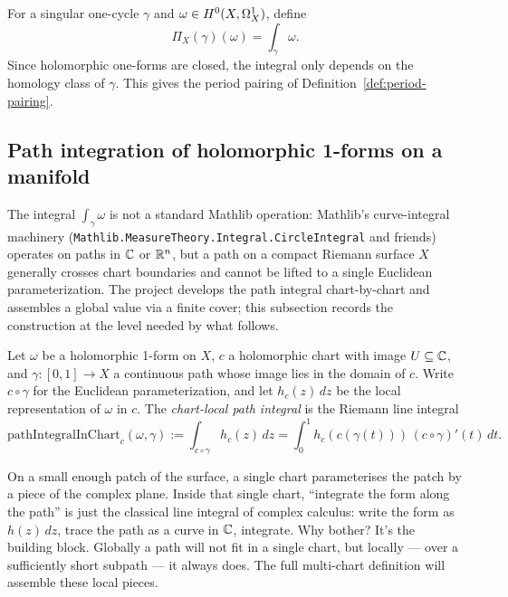 For a singular one-cycle \(\gamma\) and \(\omega\in H^{0}(X,\Omega^{1}_{X})\), define
\[
  \Pi_X(\gamma)(\omega)=\int_{\gamma}\omega.
\]
Since holomorphic one-forms are closed, the integral only depends on the
homology class of \(\gamma\). This gives the period pairing of
Definition~\ref{def:period-pairing}.

\subsection{Path integration of holomorphic 1-forms on a manifold}

The integral \(\int_\gamma\omega\) is not a standard Mathlib operation:
Mathlib's curve-integral machinery
(\texttt{Mathlib.MeasureTheory.Integral.CircleIntegral} and friends)
operates on paths in \(\mathbb{C}\) or \(\mathbb{R}^n\), but a path on a compact
Riemann surface \(X\) generally crosses chart boundaries and cannot
be lifted to a single Euclidean parameterization. The project
develops the path integral chart-by-chart and assembles a global
value via a finite cover; this subsection records the construction
at the level needed by what follows.

\begin{definition}
\label{def:path-integral-in-chart}
Let \(\omega\) be a holomorphic 1-form on \(X\), \(c\) a holomorphic
chart with image \(U\subseteq\mathbb{C}\), and \(\gamma:[0,1]\to X\) a
continuous path whose image lies in the domain of \(c\). Write
\(c\circ\gamma\) for the Euclidean parameterization, and let
\(h_c(z)\,dz\) be the local representation of \(\omega\) in \(c\).
The \emph{chart-local path integral} is the Riemann line integral
\[
  \mathrm{pathIntegralInChart}_c(\omega,\gamma)
    := \int_{c\circ\gamma} h_c(z)\,dz
    = \int_0^1 h_c(c(\gamma(t)))\,(c\circ\gamma)'(t)\,dt.
\]
\leanok
\end{definition}

\begin{layman}
On a small enough patch of the surface, a single chart parameterises
the patch by a piece of the complex plane. Inside that single
chart, ``integrate the form along the path'' is just the classical
line integral of complex calculus: write the form as \(h(z)\,dz\),
trace the path as a curve in \(\mathbb{C}\), integrate. Why bother? It's
the building block. Globally a path will not fit in a single chart,
but locally --- over a sufficiently short subpath --- it always does.
The full multi-chart definition will assemble these local pieces.
\end{layman}

